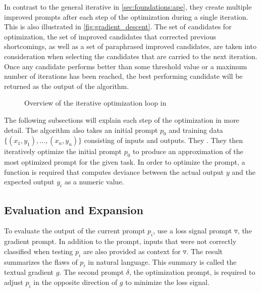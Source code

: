 In contrast to the general iterative \APE in \autoref{sec:foundations:ape}, they create multiple improved prompts after each step of the optimization during a single iteration.
This is also illustrated in \autoref{fig:gradient_descent}.
The set of candidates for optimization, the set of improved candidates that corrected previous shortcomings, as well as a set of paraphrased improved candidates, are taken into consideration when selecting the candidates that are carried to the next iteration.
Once any candidate performs better than some threshold value or a maximum number of iterations has been reached, the best performing candidate will be returned as the output of the \ProTeGi algorithm.

\begin{figure}
    \centering
    
    \caption{Overview of the iterative optimization loop in~\cite{pryzant2023AutomaticPrompt}}
    \label{fig:gradient_descent}
\end{figure}


The following subsections will explain each step of the \ProTeGi optimization in more detail.
The \ProTeGi algorithm also takes an initial prompt $p_0$ and training data $\{(x_1, y_1), \dots, (x_n, y_n)\}$ consisting of inputs and outputs.
They .
They then iteratively optimize the initial prompt $p_0$ to produce an approximation of the most optimized prompt for the given task.
In order to optimize the prompt, a function is required that computes deviance between the actual output $y$ and the expected output $y_i$ as a numeric value.

\subsection{Evaluation and Expansion}
To evaluate the output of the current prompt $p_i$, \citeauthor{pryzant2023AutomaticPrompt} use a loss signal prompt  $\triangledown$, the gradient prompt.
In addition to the prompt, inputs that were not correctly classified when testing $p_i$ are also provided as context for $\triangledown$.
The result summarizes the flaws of $p_i$ in natural language.
This summary is called the textual gradient $g$.
The second prompt $\delta$, the optimization prompt, is required to adjust $p_i$ in the opposite direction of $g$ to minimize the loss signal.

